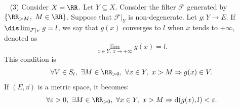 \begin{exampleenv}
    \ \newline
    (3) Consider $X=\RR$. Let $Y\subseteq X$. Consider the filter $\mathcal{F}$ generated by $\{\RR_{>M},\ M\in \RR\}$. Suppose that $\mathcal{F}|_Y$ is non-degenerate. Let $g:Y\longrightarrow E$. If $\dis \lim_{\mathcal{F}|_Y}g=l$, we say that $g(x)$ converges to $l$ when $x$ tends to $+\infty$, denoted as $$\lim_{x\in Y,\ x\rightarrow+\infty}g(x)=l.$$
     This condition is
    $$\forall V\in S_l,\ \exists M\in \RR_{>0},\ \forall x\in Y,\ x>M\Rightarrow g(x)\in V.$$
    If $(E,\dd)$ is a metric space, it becomes:
    $$\forall \varepsilon >0,\ \exists M\in \RR_{>0},\ \forall x\in Y,\ x>M\Rightarrow \mathrm{d}(g(x),l)<\varepsilon.$$
\begin{figure}[H]
        \centering
{} %

\begin{tikzpicture}[x=0.75pt,y=0.75pt,yscale=-0.6,xscale=0.8]


\end{tikzpicture}
\end{figure}
\end{exampleenv}

